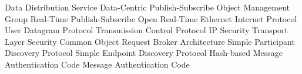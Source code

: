      {Data Distribution Service}
    {Data-Centric Publish-Subscribe}
     {Object Management Group}
    {Real-Time Publish-Subscribe}
    {Open Real-Time Ethernet}
      {Internet Protocol}
     {User Datagram Protocol}
     {Transmission Control Protocol}
   {IP Security}
     {Transport Layer Security}
   {Common Object Request Broker Architecture}
    {Simple Participant Discovery Protocol}
    {Simple Endpoint Discovery Protocol}
    {Hash-based Message Authentication Code}
     {Message Authentication Code}
